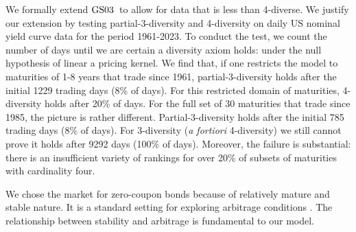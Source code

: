 \documentclass[ecta,nameyear,draft]{econsocart}
\newcommand{\gsii}{$\textup{GS03}$}
\theoremstyle{plain}
\theoremstyle{remark}
\begin{document}
We formally extend \gsii\ to allow for data that is less than 4-diverse. We
justify our extension by testing partial-3-diversity and 4-diversity on daily
US nominal yield curve data for the period 1961-2023.
To conduct the test, we count the number of days until we are certain a
diversity axiom holds: under the null hypothesis of linear a pricing kernel. We
find that, if one restricts the model to maturities of 1-8 years that trade
since 1961, partial-3-diversity holds after the initial 1229 trading days (8\%
of days). For this restricted domain of maturities, 4-diversity holds after
20\% of days. For the full set of 30 maturities that trade since 1985, the
picture is rather different. Partial-3-diversity holds after the initial 785
trading days (8\% of days). For  3-diversity (\emph{a fortiori}
4-diversity) we still cannot prove it holds after 9292 days (100\% of days).
Moreover, the failure is substantial: there is an insufficient variety of
rankings  for over 20\% of subsets of maturities with cardinality four.
 
We chose the market for zero-coupon bonds because of  relatively mature and
stable nature. It is a standard setting for exploring arbitrage
conditions \citep{barillas2019speculation}. The relationship between stability
and arbitrage is fundamental to our model. 
\end{document}
